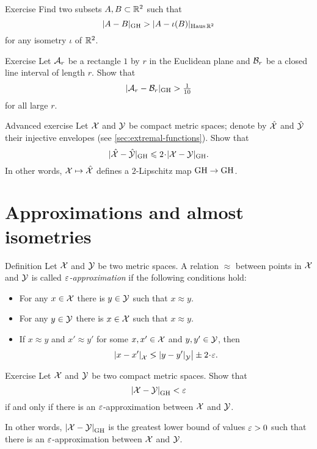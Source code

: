 \begin{thm}{Exercise}\label{ex:GH<H}
Find two subsets $A,B\subset\mathbb{R}^2$ such that 
\[|A-B|_{\operatorname{\rm GH}\nolimits}>|A-\iota(B)|_{\operatorname{\rm Haus}\nolimits\mathbb{R}^2}\]
for any isometry $\iota$ of $\mathbb{R}^2$.
\end{thm}


\begin{thm}{Exercise}\label{ex:rectangle}
Let $\mathcal{A}_r$ be a rectangle $1$ by $r$ in the Euclidean plane 
and $\mathcal{B}_r$ be a closed line interval of length $r$.
Show that 
\[|\mathcal{A}_r-\mathcal{B}_r|_{\operatorname{\rm GH}\nolimits}>\tfrac1{10}\]
for all large $r$.
\end{thm}

\begin{thm}{Advanced exercise}\label{ex:GH-inj}
Let $\mathcal{X}$ and $\mathcal{Y}$ be compact metric spaces;
denote by $\hat{\mathcal{X}}$ and $\hat{\mathcal{Y}}$ their injective envelopes (see \ref{sec:extremal-functions}).
Show that 
\[|\hat{\spc{X}}-\hat{\spc{Y}}|_{\GH}\le 2\cdot|\spc{X}- \spc{Y}|_{\GH}.\] 
In other words, $\mathcal{X}\mapsto \hat{\mathcal{X}}$ defines a $2$-Lipschitz map $\operatorname{\rm GH}\nolimits\to\operatorname{\rm GH}\nolimits$.

\end{thm}



\section{Approximations and almost isometries}\label{sec:GH-approx}

\begin{thm}{Definition}\label{ex:defGHR}
Let $\mathcal{X}$ and $\mathcal{Y}$ be two metric spaces.
A relation $\approx$ between points in $\mathcal{X}$ and $\mathcal{Y}$ is called \emph{$\varepsilon$-approximation} if the following conditions hold:
\begin{itemize}
\item For any $x\in  \mathcal{X}$ there is $y\in \mathcal{Y}$ such that $x\approx y$.
\item For any $y\in  \mathcal{Y}$ there is $x\in \mathcal{X}$ such that $x\approx y$.
\item If $x\approx y$ and $x'\approx y'$ for some $x, x'\in  \mathcal{X}$ and $y,y'\in \mathcal{Y}$, then 
\[\dist{x}{x'}{\spc{X}}\lg\dist{y}{y'}{\spc{Y}}\bigr|\pm2\cdot\eps.\]
\end{itemize}

\end{thm}

\begin{thm}{Exercise}\label{ex:H-R}
Let $\mathcal{X}$ and $\mathcal{Y}$ be two compact metric spaces.
Show that
\[\dist{\spc{X}}{\spc{Y}}{\GH}<\eps\]
if and only if there is an $\varepsilon$-approximation between $\mathcal{X}$ and $\mathcal{Y}$.

In other words, $\dist{\spc{X}}{\spc{Y}}{\GH}$ is the greatest lower bound of values $\varepsilon>0$ such that  there is an $\varepsilon$-approximation between $\mathcal{X}$ and $\mathcal{Y}$.
\end{thm}

